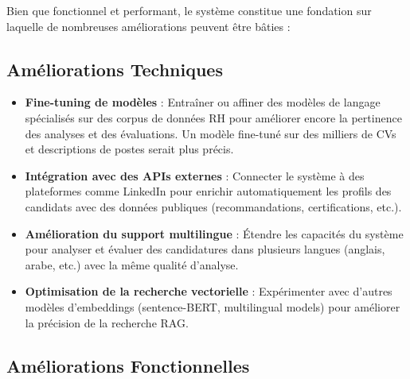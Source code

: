 \documentclass{rapportECL}
\begin{document}
Bien que fonctionnel et performant, le système constitue une fondation sur laquelle de nombreuses améliorations peuvent être bâties :

\subsection{Améliorations Techniques}

\begin{itemize}[leftmargin=*]
    \item \textbf{Fine-tuning de modèles} : Entraîner ou affiner des modèles de langage spécialisés sur des corpus de données RH pour améliorer encore la pertinence des analyses et des évaluations. Un modèle fine-tuné sur des milliers de CVs et descriptions de postes serait plus précis.
    
    \item \textbf{Intégration avec des APIs externes} : Connecter le système à des plateformes comme LinkedIn pour enrichir automatiquement les profils des candidats avec des données publiques (recommandations, certifications, etc.).
    
    \item \textbf{Amélioration du support multilingue} : Étendre les capacités du système pour analyser et évaluer des candidatures dans plusieurs langues (anglais, arabe, etc.) avec la même qualité d'analyse.
    
    \item \textbf{Optimisation de la recherche vectorielle} : Expérimenter avec d'autres modèles d'embeddings (sentence-BERT, multilingual models) pour améliorer la précision de la recherche RAG.
\end{itemize}

\subsection{Améliorations Fonctionnelles}
\end{document}
